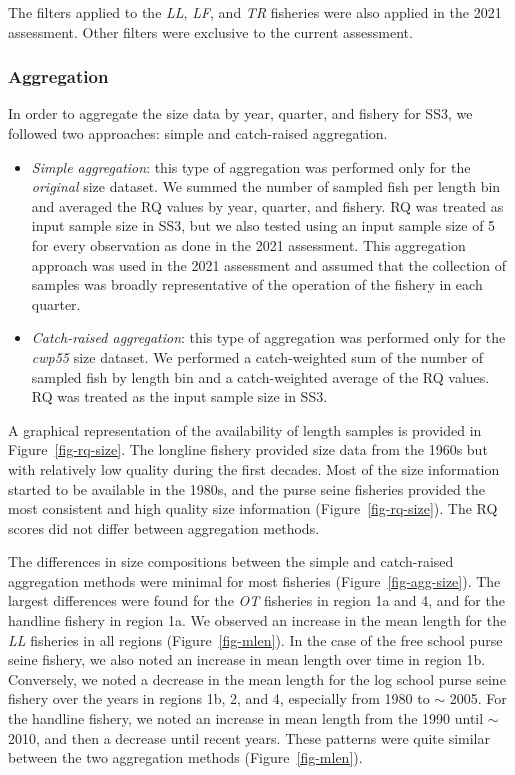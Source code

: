 \documentclass[
]{scrartcl}
\begin{document}
The filters applied to the \emph{LL}, \emph{LF}, and \emph{TR} fisheries
were also applied in the 2021 assessment. Other filters were exclusive
to the current assessment.

\subsubsection{Aggregation}\label{aggregation-1}

In order to aggregate the size data by year, quarter, and fishery for
SS3, we followed two approaches: simple and catch-raised aggregation.

\begin{itemize}
\item
  \emph{Simple aggregation}: this type of aggregation was performed only
  for the \emph{original} size dataset. We summed the number of sampled
  fish per length bin and averaged the RQ values by year, quarter, and
  fishery. RQ was treated as input sample size in SS3, but we also
  tested using an input sample size of 5 for every observation as done
  in the 2021 assessment. This aggregation approach was used in the 2021
  assessment and assumed that the collection of samples was broadly
  representative of the operation of the fishery in each quarter.
\item
  \emph{Catch-raised aggregation}: this type of aggregation was
  performed only for the \emph{cwp55} size dataset. We performed a
  catch-weighted sum of the number of sampled fish by length bin and a
  catch-weighted average of the RQ values. RQ was treated as the input
  sample size in SS3.
\end{itemize}

A graphical representation of the availability of length samples is
provided in Figure~\ref{fig-rq-size}. The longline fishery provided size
data from the 1960s but with relatively low quality during the first
decades. Most of the size information started to be available in the
1980s, and the purse seine fisheries provided the most consistent and
high quality size information (Figure~\ref{fig-rq-size}). The RQ scores
did not differ between aggregation methods.

The differences in size compositions between the simple and catch-raised
aggregation methods were minimal for most fisheries
(Figure~\ref{fig-agg-size}). The largest differences were found for the
\emph{OT} fisheries in region 1a and 4, and for the handline fishery in
region 1a. We observed an increase in the mean length for the \emph{LL}
fisheries in all regions (Figure~\ref{fig-mlen}). In the case of the
free school purse seine fishery, we also noted an increase in mean
length over time in region 1b. Conversely, we noted a decrease in the
mean length for the log school purse seine fishery over the years in
regions 1b, 2, and 4, especially from 1980 to \(\sim\) 2005. For the
handline fishery, we noted an increase in mean length from the 1990
until \(\sim\) 2010, and then a decrease until recent years. These
patterns were quite similar between the two aggregation methods
(Figure~\ref{fig-mlen}).
\end{document}
